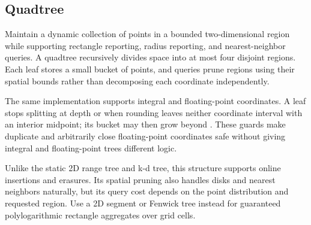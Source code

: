 \subsection{Quadtree}
\label{sec:2.6.5}
Maintain a dynamic collection of points in a bounded two-dimensional region while supporting rectangle reporting, radius reporting, and nearest-neighbor queries. A quadtree recursively divides space into at most four disjoint regions. Each leaf stores a small bucket of points, and queries prune regions using their spatial bounds rather than decomposing each coordinate independently.

The same implementation supports integral and floating-point coordinates. A leaf stops splitting at depth  or when rounding leaves neither coordinate interval with an interior midpoint; its bucket may then grow beyond . These guards make duplicate and arbitrarily close floating-point coordinates safe without giving integral and floating-point trees different logic.

Unlike the static 2D range tree and k-d tree, this structure supports online insertions and erasures. Its spatial pruning also handles disks and nearest neighbors naturally, but its query cost depends on the point distribution and requested region. Use a 2D segment or Fenwick tree instead for guaranteed polylogarithmic rectangle aggregates over grid cells.

